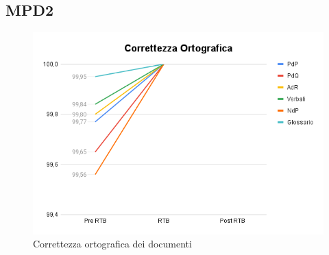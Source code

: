 \subsection{MPD2}
\begin{figure}[h!]
    \centering
    \includegraphics[scale=0.65]{../../assets/correttezza_ortografica.png}
    \caption{Correttezza ortografica dei documenti}
\end{figure}